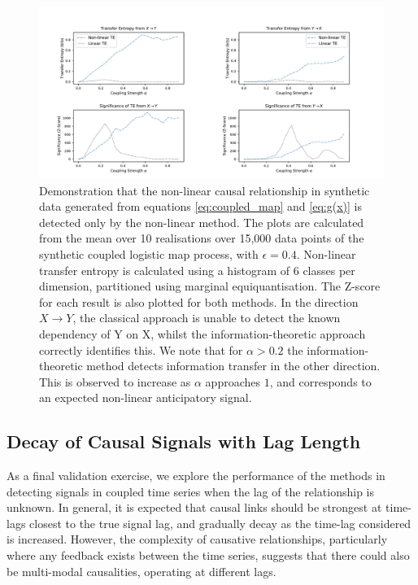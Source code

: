\documentclass[]{rsos}%
\begin{document}
\begin{figure}[!htb]
    \includegraphics[width=\linewidth]{images/confirming_logmap.pdf}
    \caption{Demonstration that the non-linear causal relationship in synthetic data generated from equations \ref{eq:coupled_map} and \ref{eq:g(x)} is detected only by the non-linear method. The plots are calculated from the mean over 10 realisations over 15,000 data points of the synthetic coupled logistic map process, with $\epsilon = 0.4$. Non-linear transfer entropy is calculated using a histogram of 6 classes per dimension, partitioned using marginal equiquantisation. The Z-score for each result is also plotted for both methods. In the direction $X \rightarrow Y$, the classical approach is unable to detect the known dependency of Y on X, whilst the information-theoretic approach correctly identifies this.  We note that for $\alpha>0.2$ the information-theoretic method detects information transfer in the other direction. This is observed to increase as $\alpha$ approaches $1$, and corresponds to an expected non-linear anticipatory signal.
    }
    \label{fig:CLM_confirmation}
  \end{figure}

  \subsection{Decay of Causal Signals with Lag Length}
  As a final validation exercise, we explore the performance of the methods in detecting signals in coupled time series when the lag of the relationship is unknown. In general, it is expected that causal links should be strongest at time-lags closest to the true signal lag, and gradually decay as the time-lag considered is increased. However, the complexity of causative relationships, particularly where any feedback exists between the time series, suggests that there could also be multi-modal causalities, operating at different lags.  
\end{document}

